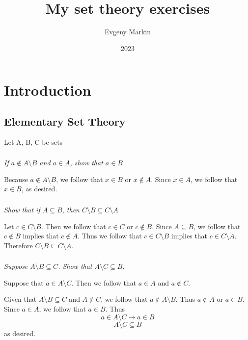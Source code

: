 \documentclass[11pt,oneside,titlepage]{book}
\title{My set theory exercises}
\author{Evgeny Markin}
\date{2023}
\begin{document}
\maketitle
\tableofcontents

\chapter{Introduction}

\section{Elementary Set Theory}

Let A, B, C be sets

\subsection{}

\textit{If $a \notin A \setminus B$ and $a \in A$, show that $a \in B$}

Because $a \notin A \setminus B$, we follow that $x \in B$ or $x \notin A$. Since $x \in A$, we
follow that $x \in B$, as desired.

\subsection{}

\textit{Show that if $A \subseteq B$, then $C \setminus B \subseteq C \setminus A$}

Let $c \in C \setminus B$. Then we follow that $c \in C$ or $c \notin B$. Since $A \subseteq B$,
we follow that $c \notin B$ implies that $c \notin A$. Thus we follow that
$c \in C \setminus B$ implies that $c \in C \setminus A$. Therefore $C \setminus B \subseteq
C \setminus A$.

\subsection{}

\textit{Suppose $A \setminus B \subseteq C$. Show that $A \setminus C \subseteq B$.}

Suppose that $a \in A \setminus C$. Then we follow that $a \in A$ and $a \notin C$.

Given that $A \setminus B \subseteq C$ and $A \notin C$, we follow that $a \notin A \setminus B$.
Thus $a \notin A$ or $a \in B$. Since $a \in A$, we follow that $a \in B$. Thus
$$a \in A \setminus C \to a \in B$$
$$A \setminus C \subseteq  B$$
as desired.
\end{document}
